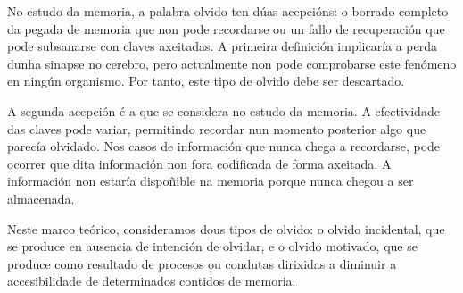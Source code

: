 \documentclass[a4paper,11pt]{article}
\begin{document}
No estudo da memoria, a palabra olvido ten dúas acepcións: o borrado completo da pegada de memoria que non pode recordarse ou un fallo de recuperación que pode subsanarse con claves axeitadas. A primeira definición implicaría a perda dunha sinapse no cerebro, pero actualmente non pode comprobarse este fenómeno en ningún organismo. Por tanto, este tipo de olvido debe ser descartado.

A segunda acepción é a que se considera no estudo da memoria. A efectividade das claves pode variar, permitindo recordar nun momento posterior algo que parecía olvidado. Nos casos de información que nunca chega a recordarse, pode ocorrer que dita información non fora codificada de forma axeitada. A información non estaría dispoñible na memoria porque nunca chegou a ser almacenada.

Neste marco teórico, consideramos dous tipos de olvido: o olvido incidental, que se produce en ausencia de intención de olvidar, e o olvido motivado, que se produce como resultado de procesos ou condutas dirixidas a diminuir a accesibilidade de determinados contidos de memoria.
\end{document}
